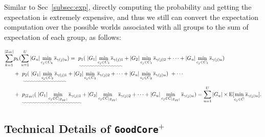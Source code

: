 Similar to Sec~\ref{subsec:exp}, directly computing the probability and getting the expectation is extremely expensive, and thus we still can convert the expectation computation over the possible worlds associated with all groups to the sum of expectation of each group, as follows:

\begin{equation}\label{eqa:cluster-4}
	\begin{aligned}
		\sum_{k= 1}^{|\worlds|} & p_k (\sum_{u=1}^U  |\group_u|  \min_{c_j\in C_k} \overline{s}_{\gamma(j)u}) =~  \uwave{p_1(~|G_1|\min_{c_j\in C_1}\overline{s}_{\gamma(j)1}} + |G_2|\min_{c_j\in C_1}\overline{s}_{\gamma(j)2} + \cdots + |G_u|\min_{c_j\in C_1}\overline{s}_{\gamma(j)u})  \\
		 &   + ~ \uwave{p_2(~|G_1|\min_{c_j\in C_2}\overline{s}_{\gamma(j)1}} + |G_2|\min_{c_j\in C_2}\overline{s}_{\gamma(j)2} + \cdots + |G_u|\min_{c_j\in C_2}\overline{s}_{\gamma(j)u})  ~ + \cdots \\
		  &   + ~ \uwave{p_{|\worlds|}(~|G_1|\min_{c_j\in C_{|\worlds|}}\overline{s}_{\gamma(j)1}} + |G_2|\min_{c_j\in C_{|\worlds|}}\overline{s}_{\gamma(j)2} + \cdots + |G_u|\min_{c_j\in C_{|\worlds|}}\overline{s}_{\gamma(j)u})  = \sum_{u=1}^U  |\group_u| \times\mathrm{E}[\min_{c_j\in \hat{\core}}\overline{s}_{\gamma(j)u}].
	\end{aligned}
\end{equation}

\subsection{Technical Details of \texttt{GoodCore}$^+$}

\vspace{.5em}

